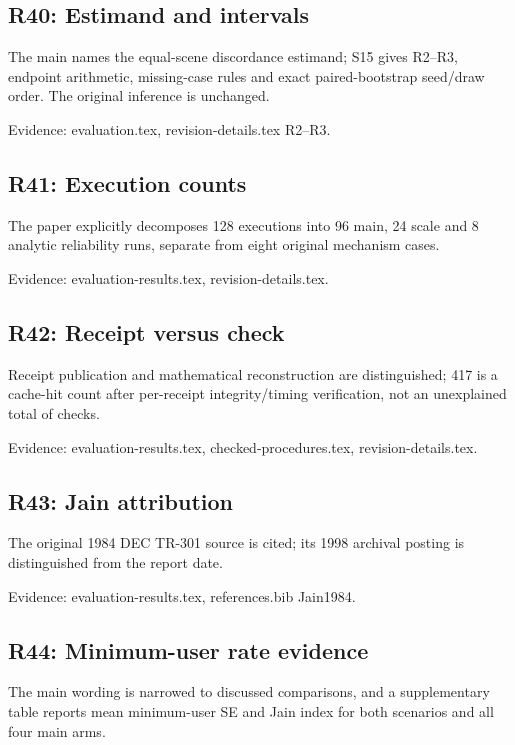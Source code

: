 \documentclass[10pt]{article}
\begin{document}
\subsection*{R40: Estimand and intervals}

The main names the equal-scene discordance estimand; S15 gives R2--R3, endpoint arithmetic, missing-case rules and exact paired-bootstrap seed/\allowbreak draw order. The original inference is unchanged.

{\small Evidence: evaluation.tex, revision-details.tex R2--R3.}

\subsection*{R41: Execution counts}

The paper explicitly decomposes 128 executions into 96 main, 24 scale and 8 analytic reliability runs, separate from eight original mechanism cases.

{\small Evidence: evaluation-results.tex, revision-details.tex.}

\subsection*{R42: Receipt versus check}

Receipt publication and mathematical reconstruction are distinguished; 417 is a cache-hit count after per-receipt integrity/\allowbreak timing verification, not an unexplained total of checks.

{\small Evidence: evaluation-results.tex, checked-procedures.tex, revision-details.tex.}

\subsection*{R43: Jain attribution}

The original 1984 DEC TR-301 source is cited; its 1998 archival posting is distinguished from the report date.

{\small Evidence: evaluation-results.tex, references.bib Jain1984.}

\subsection*{R44: Minimum-user rate evidence}

The main wording is narrowed to discussed comparisons, and a supplementary table reports mean minimum-user SE and Jain index for both scenarios and all four main arms.
\end{document}
